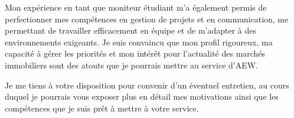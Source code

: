 \documentclass[11pt,a4paper,french]{moderncv}        %
\begin{document}
Mon expérience en tant que moniteur étudiant m’a également permis de perfectionner mes compétences en gestion de projets et en communication, me permettant de travailler efficacement en équipe et de m’adapter à des environnements exigeants. Je suis convaincu que mon profil rigoureux, ma capacité à gérer les priorités et mon intérêt pour l’actualité des marchés immobiliers sont des atouts que je pourrais mettre au service d'AEW.

Je me tiens à votre disposition pour convenir d’un éventuel entretien, au cours duquel je pourrais vous exposer plus en détail mes motivations ainsi que les compétences que je suis prêt à mettre à votre service.














\makeletterclosing
\end{document}
